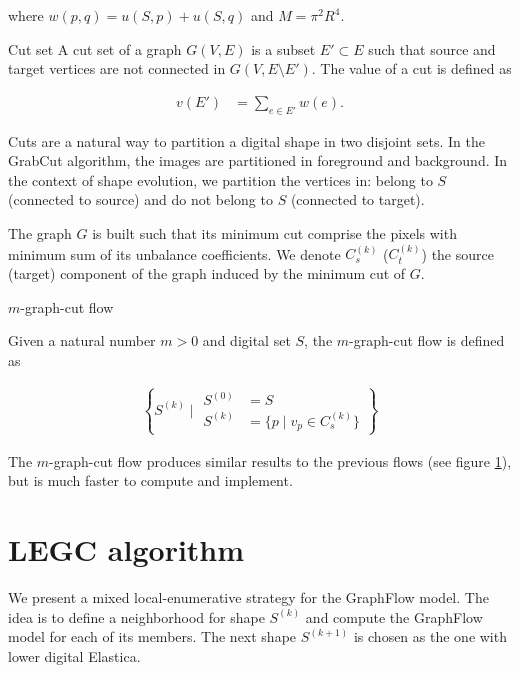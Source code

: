 where $w(p,q) = u(S,p) + u(S,q)$ and $M=\pi^2 R^4$. 

\begin{definition}{Cut set}
 A cut set of a graph $G(V,E)$ is a subset $E' \subset E$ such that source and target vertices are not connected in $G(V,E \setminus E')$. The value of a cut is defined as
 
 \begin{align*}
 	v(E') &= \sum_{e \in E'}{w(e)}.
 \end{align*}
 
\end{definition}

Cuts are a natural way to partition a digital shape in two disjoint sets. In the GrabCut algorithm, the images are partitioned in foreground and background. In the context of shape evolution, we partition the vertices in: belong to $S$ (connected to source) and do not belong to $S$ (connected to target).

The graph $G$ is built such that its minimum cut comprise the pixels with minimum sum of its unbalance coefficients. We denote $C_s^{(k)}$ ($C_t^{(k)}$) the source (target) component of the graph induced by the minimum cut of $G$. 

\begin{definition}{$m$-graph-cut flow}

Given a natural number $m>0$ and digital set $S$, the $m$-graph-cut flow is defined as

\begin{align*}
	\left \{ S^{(k)} \; | \; \begin{array}{ll}
	S^{(0)}&=S \\
	S^{(k)}&= \{ p \; | \; v_p \in C_s^{(k)} \}
	\end{array} \right\}
\end{align*}

\end{definition}

The $m$-graph-cut flow produces similar results to the previous flows (see figure \ref{}), but is much faster to compute and implement. 

\section{LEGC algorithm}
	We present a mixed local-enumerative strategy for the GraphFlow model. The idea is to define a neighborhood for shape $S^{(k)}$ and compute the GraphFlow model for each of its members. The next shape $S^{(k+1)}$ is chosen as the one with lower digital Elastica.

